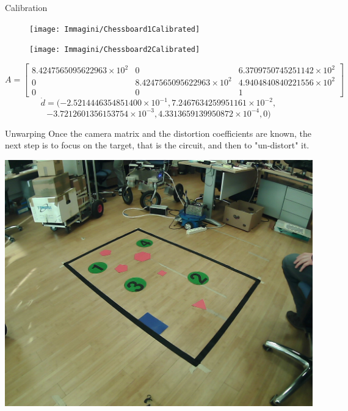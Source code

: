\begin{frame}{Calibration}
	\begin{figure}[H]
		\begin{minipage}{0.48\linewidth}
			\texttt{[image: Immagini/Chessboard1Calibrated]}
		\end{minipage}
		\vspace{0.04\linewidth}
		\begin{minipage}{0.48\linewidth}
			\texttt{[image: Immagini/Chessboard2Calibrated]}
		\end{minipage}
	\end{figure}
	\stsize
	\[A=\begin{bmatrix}
		8.4247565095622963\times10^2 & 0 & 6.3709750745251142\times10^2\\
		0 & 8.4247565095622963\times10^2 & 4.9404840840221556\times10^2\\
		0 & 0 & 1
	\end{bmatrix}\]\[
	\dot{d}=(-2.5214446354851400\times10^{-1}, 7.2467634259951161\times10^{-2},\]\[-3.7212601356153754\times10^{-3}, 4.3313659139950872\times10^{-4}, 0)
	\]
\end{frame}

\begin{frame}{Unwarping}
Once the camera matrix and the distortion coefficients are known, the next step is to focus on the target, that is the circuit, and then to "un-distort" it. 
\begin{center}
	\includegraphics[scale=0.155]{Immagini/Wrapped.jpg}
\end{center}
\end{frame}

